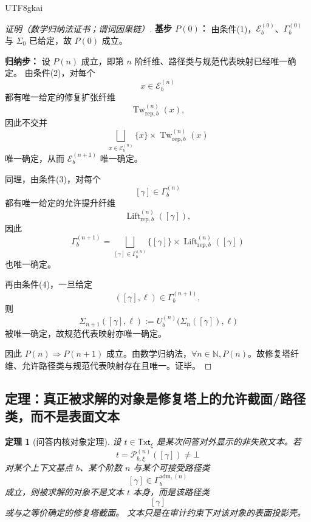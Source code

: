 \documentclass[12pt]{article}
\newtheorem{theorem}{定理}[section]
\begin{document}
\begin{CJK*}{UTF8}{gkai}
\begin{proof}[证明（数学归纳法证书；谓词因果链）]
\textbf{基步 $P(0)$：}
由条件(1)，$\mathcal{E}_b^{(0)}$、$\Gamma_b^{(0)}$ 与 $\Sigma_0$ 已给定，故 $P(0)$ 成立。

\textbf{归纳步：}
设 $P(n)$ 成立，即第 $n$ 阶纤维、路径类与规范代表映射已经唯一确定。
由条件(2)，对每个
\[
  x\in \mathcal{E}_b^{(n)}
\]
都有唯一给定的修复扩张纤维
\[
  \operatorname{Tw}_{\mathrm{rep},b}^{(n)}(x),
\]
因此不交并
\[
  \bigsqcup_{x\in\mathcal{E}_b^{(n)}}
  \{x\}\times \operatorname{Tw}_{\mathrm{rep},b}^{(n)}(x)
\]
唯一确定，从而 $\mathcal{E}_b^{(n+1)}$ 唯一确定。

同理，由条件(3)，对每个
\[
  [\gamma]\in \Gamma_b^{(n)}
\]
都有唯一给定的允许提升纤维
\[
  \operatorname{Lift}_{\mathrm{rep},b}^{(n)}([\gamma]),
\]
因此
\[
  \Gamma_b^{(n+1)}
  =
  \bigsqcup_{[\gamma]\in\Gamma_b^{(n)}}
  \{[\gamma]\}\times \operatorname{Lift}_{\mathrm{rep},b}^{(n)}([\gamma])
\]
也唯一确定。

再由条件(4)，一旦给定
\[
  ([\gamma],\ell)\in \Gamma_b^{(n+1)},
\]
则
\[
  \Sigma_{n+1}([\gamma],\ell)
  :=
  U_b^{(n)}\bigl(\Sigma_n([\gamma]),\ell\bigr)
\]
被唯一确定，故规范代表映射亦唯一确定。

因此 $P(n)\Rightarrow P(n+1)$ 成立。由数学归纳法，$\forall n\in\mathbb{N}, P(n)$。故修复塔纤维、允许路径类与规范代表映射存在且唯一。证毕。
\end{proof}

\subsection{定理：真正被求解的对象是修复塔上的允许截面/路径类，而不是表面文本}
\label{subsec:tex37-ch4-object}

\begin{theorem}[问答内核对象定理]
\label{thm:tex37-ch4-object}
设 $t\in \mathsf{Txt}_\xi$ 是某次问答对外显示的非失败文本。若
\[
  t=\mathcal{P}^{(n)}_{b,\xi}([\gamma])\neq\bot
\]
对某个上下文基点 $b$、某个阶数 $n$ 与某个可接受路径类
\[
  [\gamma]\in \Gamma_b^{\mathrm{adm},(n)}
\]
成立，则被求解的对象不是文本 $t$ 本身，而是该路径类
\[
  [\gamma]
\]
或与之等价确定的修复塔截面。
文本只是在审计约束下对该对象的表面投影壳。
\end{theorem}


\end{CJK*}
\end{document}
